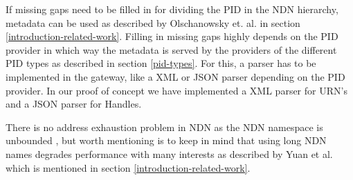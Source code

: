 If missing gaps need to be filled in for dividing the PID in the NDN hierarchy, 
metadata can be used as described by Olschanowsky et. al. \cite{ndn-clim} in section \ref{introduction-related-work}. 
Filling in missing gaps highly depends on the PID provider in which way the metadata is served by the providers of the different PID types as 
described in section \ref{pid-types}. For this, a parser has to be implemented in the gateway, like a XML or JSON parser depending on the PID provider. In our proof of concept we have implemented a XML parser for URN's and a JSON parser for Handles.

There is no address exhaustion problem in NDN as the NDN namespace is unbounded \cite{ndn-nspace}, but worth mentioning is to keep in mind that using long NDN names degrades performance with many interests as described by Yuan et al. \cite{yuan2012scalable} 
which is mentioned in section \ref{introduction-related-work}.









